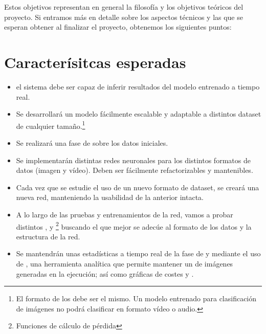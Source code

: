 Estos objetivos representan en general la filosofía y los objetivos teóricos del proyecto. Si entramos más en detalle sobre los aspectos técnicos y las  que se esperan obtener al finalizar el proyecto, obtenemos los siguientes puntos:

\section{Caracterísitcas esperadas}

\begin{itemize}
  \item el sistema debe ser capaz de inferir resultados del modelo entrenado a tiempo real.
  \item Se desarrollará un modelo fácilmente escalable y adaptable a distintos dataset de cualquier tamaño.\footnote{El formato de los  debe ser el mismo. Un modelo entrenado para clasificación de imágenes no podrá clasificar en formato vídeo o audio.}
  \item Se realizará una fase de  sobre los datos iniciales.
  \item Se implementarán distintas redes neuronales para los distintos formatos de datos (imagen y vídeo). Deben ser fácilmente refactorizables y mantenibles.
  \item Cada vez que se estudie el uso de un nuevo formato de dataset, se creará una nueva red, manteniendo la usabilidad de la anterior intacta.
  \item A lo largo de las pruebas y entrenamientos de la red, vamos a probar distintos ,  y \footnote{Funciones de cálculo de pérdida} buscando el que mejor se adecúe al formato de los datos y la estructura de la red.
  \item Se mantendrán unas estadísticas a tiempo real de la fase de  y  mediante el uso de , una herramienta analítica que permite mantener un  de imágenes generadas en la ejecución; así como gráficas de costes y .
\end{itemize}
